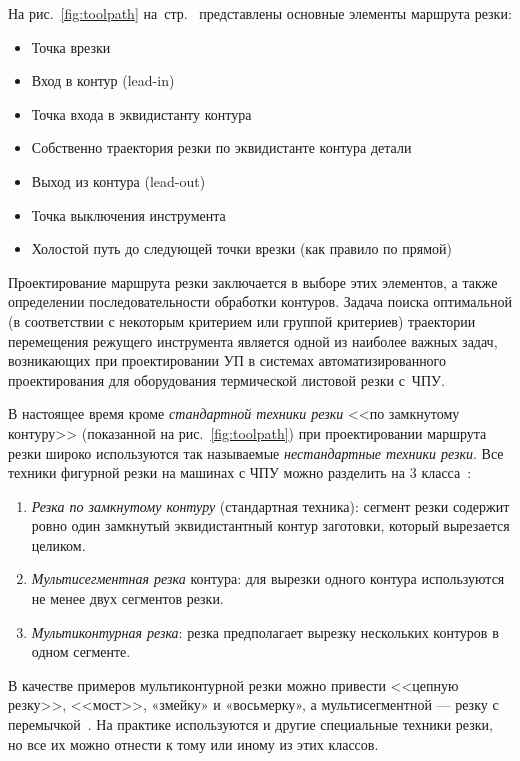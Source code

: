 На рис.~\ref{fig:toolpath}
на~стр.~\pageref{fig:toolpath}
представлены основные элементы маршрута резки:
\begin{itemize}
  \item Точка врезки
  \item Вход в контур (lead-in)
  \item Точка входа в эквидистанту контура
  \item Собственно траектория резки по эквидистанте контура детали
  \item Выход из контура (lead-out)
  \item Точка выключения инструмента
  \item Холостой путь до следующей точки врезки
  (как правило по прямой)
\end{itemize}

Проектирование маршрута резки заключается в выборе
этих элементов,
а также определении последовательности обработки контуров.
Задача поиска оптимальной
(в соответствии с некоторым критерием или группой критериев)
траектории перемещения режущего
инструмента является одной из наиболее
важных задач, возникающих при проектировании УП
в системах автоматизированного проектирования для
оборудования термической листовой резки
с~ЧПУ.

В настоящее время кроме \textit{стандартной техники резки}
<<по замкнутому контуру>>
(показанной на рис.~\ref{fig:toolpath})
при проектировании маршрута резки широко используются
так называемые
\textit{нестандартные техники резки}.
Все техники фигурной резки на
машинах с ЧПУ можно разделить на 3 класса~\cite{bi:Petunin2015}:
\begin{enumerate}
  \item \textit{Резка по замкнутому контуру}
  (стандартная техника):
  сегмент резки содержит ровно один замкнутый эквидистантный контур
  заготовки, который вырезается целиком.
  \item \textit{Мультисегментная резка} контура:
  для вырезки одного
  контура используются не менее двух сегментов резки.
  \item \textit{Мультиконтурная резка}:
  резка предполагает вырезку нескольких контуров в одном сегменте.
\end{enumerate}

В качестве примеров мультиконтурной резки можно привести
<<цепную резку>>, <<мост>>, «змейку» и «восьмерку»,
а  мультисегментной --- резку с перемычкой~\cite{bi:book2020}.
На практике используются и другие специальные техники резки,
но все их можно отнести к тому или иному из этих классов.
